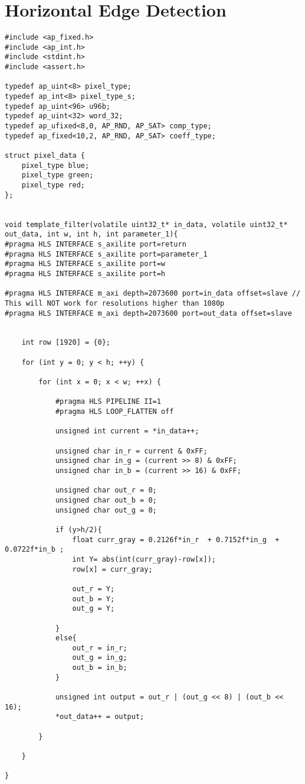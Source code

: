 \section{Horizontal Edge Detection}
\lstset{language=C++}
\begin{lstlisting}
#include <ap_fixed.h>
#include <ap_int.h>
#include <stdint.h>
#include <assert.h>

typedef ap_uint<8> pixel_type;
typedef ap_int<8> pixel_type_s;
typedef ap_uint<96> u96b;
typedef ap_uint<32> word_32;
typedef ap_ufixed<8,0, AP_RND, AP_SAT> comp_type;
typedef ap_fixed<10,2, AP_RND, AP_SAT> coeff_type;

struct pixel_data {
    pixel_type blue;
    pixel_type green;
    pixel_type red;
};


void template_filter(volatile uint32_t* in_data, volatile uint32_t* out_data, int w, int h, int parameter_1){
#pragma HLS INTERFACE s_axilite port=return
#pragma HLS INTERFACE s_axilite port=parameter_1
#pragma HLS INTERFACE s_axilite port=w
#pragma HLS INTERFACE s_axilite port=h

#pragma HLS INTERFACE m_axi depth=2073600 port=in_data offset=slave // This will NOT work for resolutions higher than 1080p
#pragma HLS INTERFACE m_axi depth=2073600 port=out_data offset=slave


    int row [1920] = {0}; 

    for (int y = 0; y < h; ++y) {

        for (int x = 0; x < w; ++x) {

            #pragma HLS PIPELINE II=1
            #pragma HLS LOOP_FLATTEN off

            unsigned int current = *in_data++;

            unsigned char in_r = current & 0xFF;
            unsigned char in_g = (current >> 8) & 0xFF;
            unsigned char in_b = (current >> 16) & 0xFF;

            unsigned char out_r = 0;
            unsigned char out_b = 0;
            unsigned char out_g = 0;

            if (y>h/2){
                float curr_gray = 0.2126f*in_r  + 0.7152f*in_g  + 0.0722f*in_b ;
                int Y= abs(int(curr_gray)-row[x]);
                row[x] = curr_gray;

                out_r = Y;
                out_b = Y;
                out_g = Y;

            }
            else{
                out_r = in_r;
                out_g = in_g;
                out_b = in_b;
            }

            unsigned int output = out_r | (out_g << 8) | (out_b << 16);
            *out_data++ = output;

        }

    }

}

\end{lstlisting}

